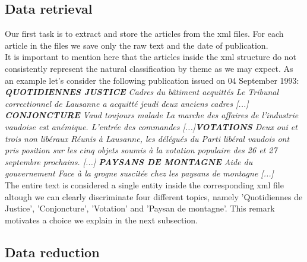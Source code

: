 \documentclass[11pt]{article}
\begin{document}
\subsection{Data retrieval}

Our first task is to extract and store the articles from the xml files.
For each article in the files we save only the raw text and the date of publication.\\
It is important to mention here that the articles inside the xml structure do not consistently represent the natural classification by theme as we may expect. As an example let's consider the following publication issued on 04 September 1993:\\ %

\textit{\textbf{QUOTIDIENNES JUSTICE} Cadres du bâtiment acquittés Le Tribunal correctionnel de Lausanne a acquitté jeudi deux anciens cadres [...] \textbf{CONJONCTURE} Vaud toujours malade La marche des affaires de l'industrie vaudoise est anémique. L'entrée des commandes [...]\textbf{VOTATIONS} Deux oui et trois non libéraux Réunis à Lausanne, les délégués du Parti libéral vaudois ont pris position sur les cinq objets soumis à la votation populaire des 26 et 27 septembre prochains. [...] \textbf{PAYSANS DE MONTAGNE} Aide du gouvernement Face à la grogne suscitée chez les paysans de montagne [...]}\\

The entire text is considered a single entity inside the corresponding xml file altough we can clearly discriminate four different topics, namely 'Quotidiennes de Justice', 'Conjoncture', 'Votation' and 'Paysan de montagne'. This remark motivates a choice we explain in the next subsection.

\subsection{Data reduction}
\end{document}
